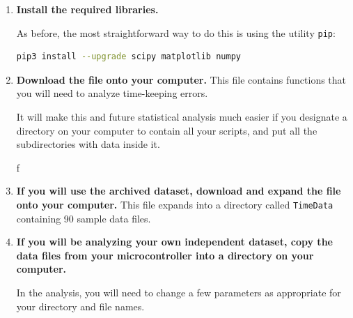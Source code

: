 \begin{enumerate}
	\item \textbf{Install the required \python libraries.}
	
	As before, the most straightforward way to do this is using the utility \lstinline{pip}:
\begin{lstlisting}[language=bash]
pip3 install --upgrade scipy matplotlib numpy
\end{lstlisting}	
	
	\item \textbf{Download the file}  \textbf{ onto your computer.}
	This file contains functions that you will need to analyze time-keeping errors.
	
	\smallskip
	It will make this and future statistical analysis much easier if you designate a directory on your computer to contain all your \python scripts, and put all the subdirectories with data inside it.
	
	f
	\item \textbf{If you will use the archived dataset, download and expand the file}  \textbf{ onto your computer.}
	This file expands into a directory called \lstinline{TimeData} containing 90 sample data files.
		
	\item \textbf{If you will be analyzing your own independent dataset, copy the data files from your microcontroller into a directory on your computer.}
	
	In the analysis, you will need to change a few parameters as appropriate for your directory and file names.
	

\end{enumerate}
